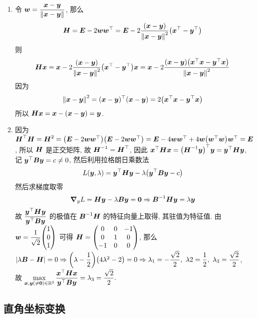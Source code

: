 \begin{solution}
  \begin{enumerate}[label=(\Roman{*})]
    \item 令 $\vb*{w}=\dfrac{\vb*{x}-\vb*{y}}{\norm{\vb*{x}-\vb*{y}}}$, 那么 $$
    \vb*{H}=\vb*{E}-2\vb*{ww}^\top=\vb*{E}-2\dfrac{(\vb*{x}-\vb*{y})}{\norm{\vb*{x}-\vb*{y}}^2}\qty(\vb*{x}^\top-\vb*{y}^\top)
    $$
    则 $$
    \vb*{Hx}=\vb*{x}-2\dfrac{(\vb*{x}-\vb*{y})}{\norm{\vb*{x}-\vb*{y}}^2}\qty(\vb*{x}^\top-\vb*{y}^\top)\vb*{x}=\vb*{x}-2\dfrac{(\vb*{x}-\vb*{y})\qty(\vb*{x}^\top\vb*{x}-\vb*{y}^\top\vb*{x})}{\norm{\vb*{x}-\vb*{y}}^2}
    $$
    因为 $$
    \norm{\vb*{x}-\vb*{y}}^2=(\vb*{x}-\vb*{y})^\top(\vb*{x}-\vb*{y})=2\qty(\vb*{x}^\top\vb*{x}-\vb*{y}^\top\vb*{x})
    $$
    所以 $\vb*{Hx}=\vb*{x}-(\vb*{x}-\vb*{y})=\vb*{y}$.
    \item 因为 $\vb*{H}^\top\vb*{H}=\vb*{H}^2=\qty(\vb*{E}-2\vb*{ww}^\top)\qty(\vb*{E}-2\vb*{ww}^\top)=\vb*{E}-4\vb*{ww}^\top+4\vb*{w}\qty(\vb*{w}^\top\vb*{w})\vb*{w}^\top=\vb*{E}$, 所以 $\vb*{H}$ 是正交矩阵, 故 $\vb*{H}^{-1}=\vb*{H}^\top$, 因此
     $\vb*{x}^\top\vb*{Hx}=\qty(\vb*{H}^{-1}\vb*{y})^\top\vb*{y}=\vb*{y}^\top\vb*{Hy}$, 记 $\vb*{y}^\top\vb*{By}=c\neq0$, 然后利用拉格朗日乘数法 $$
     L(\vb*{y},\lambda)=\vb*{y}^\top\vb*{Hy}-\lambda \qty(\vb*{y}^\top\vb*{By}-c)
     $$
     然后求梯度取零 $$
     \grad_y{L}=\vb*{Hy}-\lambda\vb*{By}=\vb*{0}\Rightarrow \vb*{B}^{-1}\vb*{Hy}=\lambda\vb*{y}
     $$
     故 $\displaystyle \dfrac{\vb*{y}^\top\vb*{Hy}}{\vb*{y}^\top\vb*{By}}$ 的极值在 $\vb*{B}^{-1}\vb*{H}$ 的特征向量上取得, 其驻值为特征值.
    由 $\vb*{w}=\dfrac{1}{\sqrt{2}}\mqty(1\\0\\1)$ 可得 $\vb*{H}=\begin{pmatrix} 0 & 0 & -1 \\ 0 & 1 & 0 \\ -1 & 0 & 0 \\\end{pmatrix}$, 那么 $|\lambda\vb*{B}-\vb*{H}|=0\Rightarrow \qty(\lambda-\dfrac{1}{2})\qty(4\lambda^2-2)=0\Rightarrow\lambda_1=-\dfrac{\sqrt{2}}{2},~\lambda2=\dfrac{1}{2},~\lambda_3=\dfrac{\sqrt{2}}{2}$, 故 
     $\displaystyle \max_{\vb*{x},\vb*{y}(\neq\vb*{0})\in \mathbb{R}^{3}}\dfrac{\vb*{x}^\top\vb*{Hx}}{\vb*{y}^\top\vb*{By}}=\lambda_3=\dfrac{\sqrt{2}}{2}.$
  \end{enumerate}
\end{solution}

\subsection{直角坐标变换}

